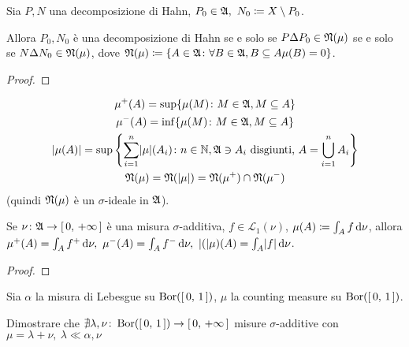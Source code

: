 \documentclass[../EserciziIstituzioniAnalisi.tex]{subfiles}
\begin{document}
\begin{exercise}
  Sia $P,N$ una decomposizione di Hahn, $P_0\in\gA,\ N_0\coloneqq X\setminus P_0$.

  Allora $P_0,N_0$ è una decomposizione di Hahn se e solo se $P\Delta P_0\in\mathfrak N(\mu)$ se e solo se $N\Delta N_0\in\mathfrak N(\mu)$, dove $\mathfrak N(\mu)\coloneqq\{A\in\mathfrak A\colon \forall B\in \mathfrak A, B\subseteq A \mu(B)=0\}$.
\end{exercise}
\begin{proof}
  
\end{proof}
\begin{exercise}
  \begin{gather*}
    \mu^+(A)=\sup\{\mu(M)\colon M\in \mathfrak A, M\subseteq A\}\\
    \mu^-(A)=\inf\{\mu(M)\colon M\in \mathfrak A, M\subseteq A\}\\
    \lvert\mu(A)\rvert=\sup\left\{\sum_{i=1}^n\lvert\mu\rvert(A_i)\colon n\in \mathbb N, \mathfrak A\ni A_i \text{ disgiunti, }A=\bigcup_{i=1}^{n}A_i\right\}\\
    \mathfrak N(\mu)=\mathfrak N(\lvert\mu\rvert)=\mathfrak N(\mu^+)\cap\mathfrak N(\mu^-)
  \end{gather*}
  (quindi $\mathfrak N(\mu)$ è un $\sigma$-ideale in  $\mathfrak A$).
  
  Se $\nu\colon \mathfrak A\to\left[\,0,\,+\infty\,\right]$ è una misura $\sigma$-additiva, $f\in\mathcal{L}_1(\nu)$, $\mu(A)\coloneqq\int_Af\,\mathrm d\nu$,
  allora $\mu^+(A)=\int_Af^+\de \nu,\ \mu^-(A)=\int_Af^-\de\nu,\ \abs(\mu)(A)=\int_A\abs{f}\de\nu$.
\end{exercise}
\begin{proof}
  
\end{proof}
\begin{exercise}
  Sia $\alpha$ la misura di Lebesgue su $\operatorname{Bor}(\left[\,0,\,1\,\right])$, $\mu$ la counting measure su $\operatorname{Bor}(\left[\,0,\,1\,\right])$.

  Dimostrare che $\nexists\lambda,\nu\colon\operatorname{Bor}(\left[\,0,\,1\,\right])\to \left[\,0,\,+\infty\,\right]$ misure $\sigma$-additive con $\mu=\lambda+\nu,\ \lambda \ll \alpha, \nu$
\end{exercise}
\end{document}
